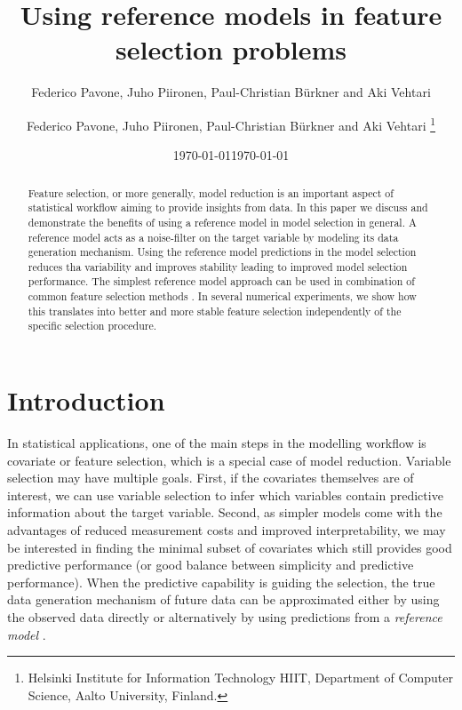 \documentclass[american,]{article}
\title{Using reference models in feature selection problems 
	\vspace{.1in}}
\author{Federico Pavone, Juho Piironen, Paul-Christian B\"{u}rkner and Aki Vehtari}
\author{
    Federico Pavone, 
  Juho Piironen,
  Paul-Christian B\"{u}rkner
  and Aki Vehtari \footnote{Helsinki Institute for Information Technology HIIT,
  Department of Computer Science, Aalto University, Finland.}
  }
\date{\today}
\date{\today}
\theoremstyle{definition}
\begin{document}
\maketitle
\begin{abstract}
  Feature selection, or more generally, model reduction is an important aspect of statistical workflow aiming to provide insights from data. In this paper we discuss and demonstrate the benefits of using a reference model in model selection in general. A reference model acts as a noise-filter on the target variable by modeling its data generation mechanism. Using the reference model predictions in the model selection reduces tha variability and improves stability leading to improved model selection performance. The simplest reference model approach can be used in combination of common feature selection methods . In several numerical experiments, we show how this translates into better and more stable feature selection independently of the specific selection procedure. 
\end{abstract}

\hypertarget{introduction}{%
\section{Introduction}\label{introduction}}

In statistical applications, one of the main steps in the modelling
workflow is covariate or feature selection, which is a special case of
model reduction. Variable selection may have multiple goals.  First,
if the covariates themselves are of interest, we can use variable
selection to infer which variables contain predictive information
about the target variable.  Second, as simpler models come with the
advantages of reduced measurement costs and improved interpretability,
we may be interested in finding the minimal subset of covariates which
still provides good predictive performance (or good balance between
simplicity and predictive performance).  When the predictive
capability is guiding the selection, the true data generation
mechanism of future data can be approximated either by using the
observed data directly or alternatively by using predictions from a
\emph{reference model} \citep{vehtari2012survey}.
\end{document}
